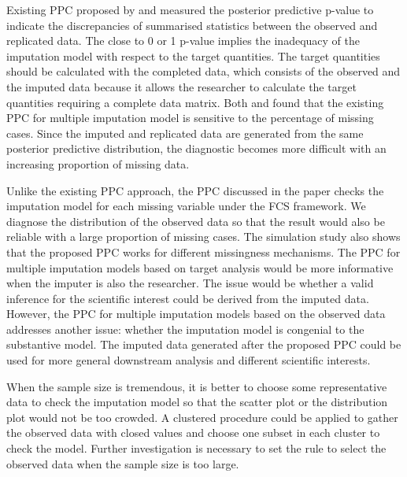 	Existing PPC proposed by \citet{he2012diagnosing} and \citet{gelman2005multiple} measured the posterior predictive p-value to indicate the discrepancies of summarised statistics between the observed and replicated data. The close to 0 or 1 p-value implies the inadequacy of the imputation model with respect to the target quantities. The target quantities should be calculated with the completed data, which consists of the observed and the imputed data because it allows the researcher to calculate the target quantities requiring a complete data matrix. Both \citet{he2012diagnosing} and \citet{nguyen2015posterior} found that the existing PPC for multiple imputation model is sensitive to the percentage of missing cases. Since the imputed and replicated data are generated from the same posterior predictive distribution, the diagnostic becomes more difficult with an increasing proportion of missing data.
	
	Unlike the existing PPC approach, the PPC discussed in the paper checks the imputation model for each missing variable under the FCS framework. We diagnose the distribution of the observed data so that the result would also be reliable with a large proportion of missing cases. The simulation study also shows that the proposed PPC works for different missingness mechanisms. The PPC for multiple imputation models based on target analysis would be more informative when the imputer is also the researcher. The issue would be whether a valid inference for the scientific interest could be derived from the imputed data. However, the PPC for multiple imputation models based on the observed data addresses another issue: whether the imputation model is congenial to the substantive model. The imputed data generated after the proposed PPC could be used for more general downstream analysis and different scientific interests.
	
	When the sample size is tremendous, it is better to choose some representative data to check the imputation model so that the scatter plot or the distribution plot would not be too crowded. A clustered procedure could be applied to gather the observed data with closed values and choose one subset in each cluster to check the model. Further investigation is necessary to set the rule to select the observed data when the sample size is too large.
	
